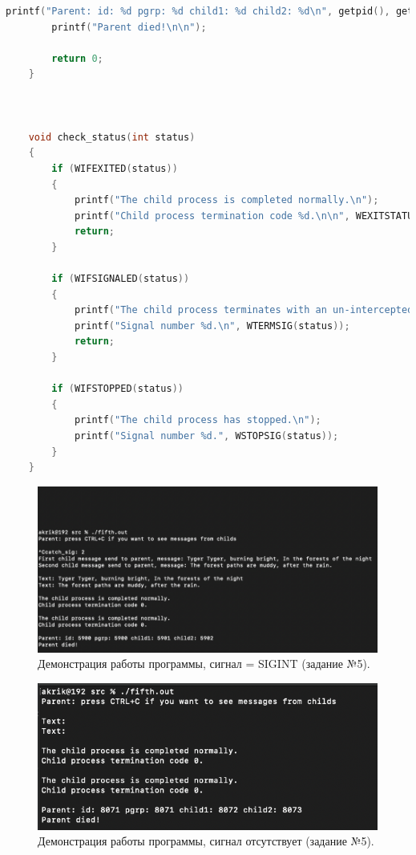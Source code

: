 \documentclass[12pt]{report}
\begin{document}
\begin{lstlisting}[label=some-code,caption=Использование сигналов,language=C]
		printf("Parent: id: %d pgrp: %d child1: %d child2: %d\n", getpid(), getpgrp(), childpid_1, childpid_2);
		printf("Parent died!\n\n");
	
		return 0;
	}
	
	
	
	void check_status(int status)
	{
		if (WIFEXITED(status))
		{
			printf("The child process is completed normally.\n");
			printf("Child process termination code %d.\n\n", WEXITSTATUS(status));
			return;
		}
	
		if (WIFSIGNALED(status))
		{
			printf("The child process terminates with an un-intercepted signal.\n");
			printf("Signal number %d.\n", WTERMSIG(status));
			return;
		}
	
		if (WIFSTOPPED(status))
		{
			printf("The child process has stopped.\n");
			printf("Signal number %d.", WSTOPSIG(status));
		}
	}
\end{lstlisting}




\begin{figure}[H]

	\centering

	\includegraphics[width=\linewidth]{img/fifth.png}
	\caption{Демонстрация работы программы, сигнал = SIGINT (задание №5).}

	\label{fig:task05_01}

\end{figure}

\begin{figure}[H]

	\centering

	\includegraphics[width=\linewidth]{img/fifth2.png}
	\caption{Демонстрация работы программы, сигнал отсутствует (задание №5).}

	\label{fig:task05_02}

\end{figure}
\end{document}
